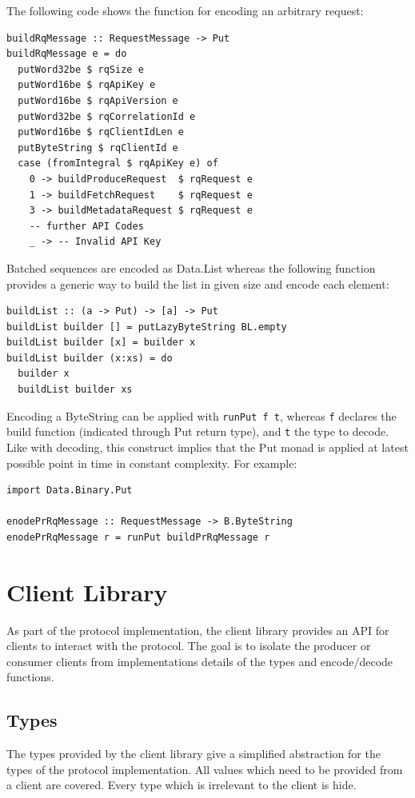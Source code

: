 The following code shows the function for encoding an arbitrary request:
\begin{lstlisting}
buildRqMessage :: RequestMessage -> Put
buildRqMessage e = do
  putWord32be $ rqSize e
  putWord16be $ rqApiKey e
  putWord16be $ rqApiVersion e
  putWord32be $ rqCorrelationId e
  putWord16be $ rqClientIdLen e
  putByteString $ rqClientId e
  case (fromIntegral $ rqApiKey e) of
    0 -> buildProduceRequest  $ rqRequest e
    1 -> buildFetchRequest    $ rqRequest e
    3 -> buildMetadataRequest $ rqRequest e
    -- further API Codes 
    _ -> -- Invalid API Key 
\end{lstlisting}

Batched sequences are encoded as Data.List whereas the following function
provides a generic way to build the list in given size and encode each element:
\begin{lstlisting}
buildList :: (a -> Put) -> [a] -> Put
buildList builder [] = putLazyByteString BL.empty
buildList builder [x] = builder x
buildList builder (x:xs) = do 
  builder x
  buildList builder xs
\end{lstlisting}

Encoding a ByteString can be applied with \lstinline{runPut f t}, whereas
\lstinline{f} declares the build function (indicated through Put return type),
and  \lstinline{t} the type to decode. Like with decoding, this construct
implies that the Put monad is applied at latest possible point in time in
constant complexity. For example: 
\begin{lstlisting}
import Data.Binary.Put

enodePrRqMessage :: RequestMessage -> B.ByteString
enodePrRqMessage r = runPut buildPrRqMessage r
\end{lstlisting}

\section{Client Library}
\label{sec:impl-prot-client}
As part of the protocol implementation, the client library provides an
API for clients to interact with the protocol. The goal is to isolate the
producer or consumer clients from implementations details of the types and
encode/decode functions. 

\subsection{Types}
The types provided by the client library give a simplified abstraction for
the types of the protocol implementation. All values which need to be
provided from a client are covered. Every type which is irrelevant to the client
is hide.

